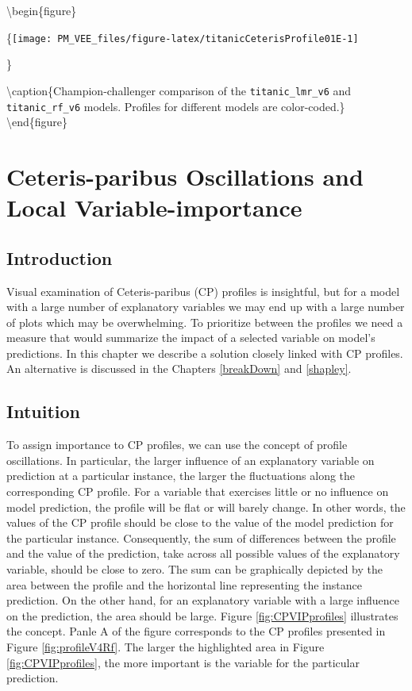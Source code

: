 \documentclass[12pt,]{krantz}
\begin{document}
\textbackslash{}begin\{figure\}

\{\centering \texttt{[image: PM\_VEE\_files/figure-latex/titanicCeterisProfile01E-1]}

\}

\textbackslash{}caption\{Champion-challenger comparison of the \texttt{titanic\_lmr\_v6} and \texttt{titanic\_rf\_v6} models. Profiles for different models are color-coded.\}\label{fig:titanicCeterisProfile01E}
\textbackslash{}end\{figure\}

\hypertarget{ceterisParibusOscillations}{%
\section{Ceteris-paribus Oscillations and Local Variable-importance}\label{ceterisParibusOscillations}}

\hypertarget{CPOscIntro}{%
\subsection{Introduction}\label{CPOscIntro}}

Visual examination of Ceteris-paribus (CP) profiles is insightful, but for a model with a large number of explanatory variables we may end up with a large number of plots which may be overwhelming. To prioritize between the profiles we need a measure that would summarize the impact of a selected variable on model's predictions. In this chapter we describe a solution closely linked with CP profiles. An alternative is discussed in the Chapters \ref{breakDown} and \ref{shapley}.

\hypertarget{CPOscIntuition}{%
\subsection{Intuition}\label{CPOscIntuition}}

To assign importance to CP profiles, we can use the concept of profile oscillations. In particular, the larger influence of an explanatory variable on prediction at a particular instance, the larger the fluctuations along the corresponding CP profile. For a variable that exercises little or no influence on model prediction, the profile will be flat or will barely change. In other words, the values of the CP profile should be close to the value of the model prediction for the particular instance. Consequently, the sum of differences between the profile and the value of the prediction, take across all possible values of the explanatory variable, should be close to zero. The sum can be graphically depicted by the area between the profile and the horizontal line representing the instance prediction. On the other hand, for an explanatory variable with a large influence on the prediction, the area should be large. Figure \ref{fig:CPVIPprofiles} illustrates the concept. Panle A of the figure corresponds to the CP profiles presented in Figure \ref{fig:profileV4Rf}. The larger the highlighted area in Figure \ref{fig:CPVIPprofiles}, the more important is the variable for the particular prediction.
\end{document}
